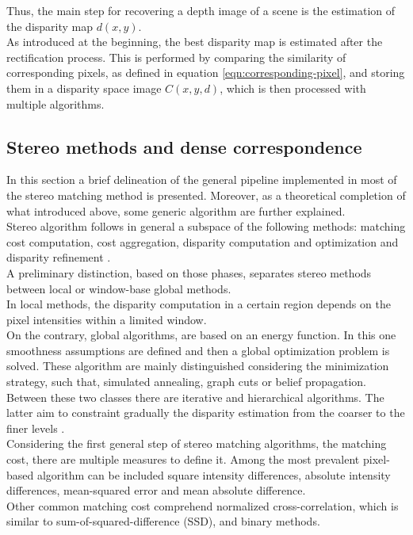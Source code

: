 Thus, the main step for recovering a depth image of a scene is the estimation of the disparity map $d(x,y)$.\\
As introduced at the beginning, the best disparity map is estimated after the rectification process. 
This is performed by comparing the similarity of corresponding pixels, as defined in equation \ref{eqn:corresponding-pixel}, and storing them in a disparity space image $C(x,y,d)$, which is then processed with multiple algorithms. 

\subsection{Stereo methods and dense correspondence}
\label{stereomethods}
In this section a brief delineation of the general pipeline implemented in most of the stereo matching method is presented. 
Moreover, as a theoretical completion of what introduced above, some generic algorithm are further explained.\\
Stereo algorithm follows in general a subspace of the following methods: matching cost computation, cost aggregation, disparity computation and optimization and disparity refinement \citep{Scharstein2001}.\\
A preliminary distinction, based on those phases, separates stereo methods between local or window-base global methods.\\
In local methods, the disparity computation in a certain region depends on the pixel intensities within a limited window.\\
On the contrary, global algorithms, are based on an energy function.
In this one smoothness assumptions are defined and then a global optimization problem is solved. 
These algorithm are mainly distinguished considering the minimization strategy, such that, simulated annealing, graph cuts or belief propagation.\\
Between these two classes there are iterative and hierarchical algorithms. 
The latter aim to constraint gradually the disparity estimation from the coarser to the finer levels \citep{Hirschmuller2008}.\\
Considering the first general step of stereo matching algorithms, the matching cost, there are multiple measures to define it.
Among the most prevalent pixel-based algorithm can be included square intensity differences, absolute intensity differences, mean-squared error and mean absolute difference.\\
Other common matching cost comprehend normalized cross-correlation, which is similar to sum-of-squared-difference (SSD), and binary methods. 
